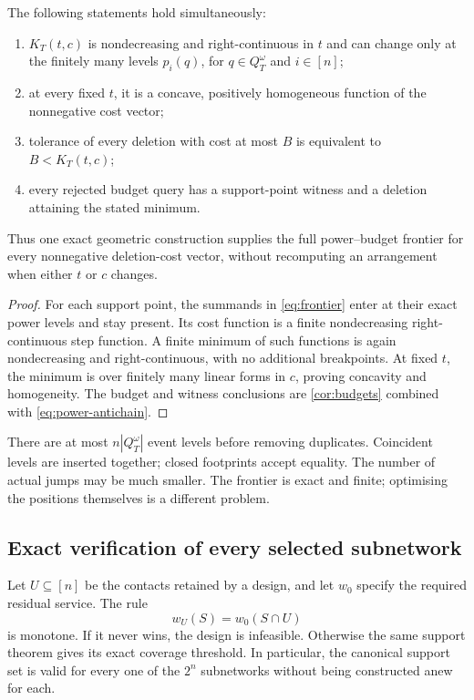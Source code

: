 \begin{theorem}\label{thm:frontier}
The following statements hold simultaneously:
\begin{enumerate}
\item $K_T(t,c)$ is nondecreasing and right-continuous in $t$ and can change only at the finitely many levels $p_i(q)$, for $q\in Q_T^\omega$ and $i\in[n]$;
\item at every fixed $t$, it is a concave, positively homogeneous function of the nonnegative cost vector;
\item tolerance of every deletion with cost at most $B$ is equivalent to $B<K_T(t,c)$;
\item every rejected budget query has a support-point witness and a deletion attaining the stated minimum.
\end{enumerate}
Thus one exact geometric construction supplies the full power--budget frontier for every nonnegative deletion-cost vector, without recomputing an arrangement when either $t$ or $c$ changes.
\end{theorem}
\begin{proof}
For each support point, the summands in \cref{eq:frontier} enter at their exact power levels and stay present. Its cost function is a finite nondecreasing right-continuous step function. A finite minimum of such functions is again nondecreasing and right-continuous, with no additional breakpoints. At fixed $t$, the minimum is over finitely many linear forms in $c$, proving concavity and homogeneity. The budget and witness conclusions are \cref{cor:budgets} combined with \cref{eq:power-antichain}.
\end{proof}

There are at most $n|Q_T^\omega|$ event levels before removing duplicates. Coincident levels are inserted together; closed footprints accept equality. The number of actual jumps may be much smaller. The frontier is exact and finite; optimising the positions themselves is a different problem.

\subsection{Exact verification of every selected subnetwork}
Let $U\subseteq[n]$ be the contacts retained by a design, and let $w_0$ specify the required residual service. The rule
\[
w_U(S)=w_0(S\cap U)
\]
is monotone. If it never wins, the design is infeasible. Otherwise the same support theorem gives its exact coverage threshold. In particular, the canonical support set is valid for every one of the $2^n$ subnetworks without being constructed anew for each.

